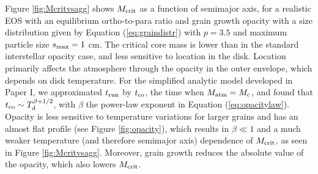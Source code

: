 Figure \ref{fig:Mcritvsagg} shows $M_{\rm crit}$ as a function of semimajor axis, for a realistic EOS with an equilibrium ortho-to-para ratio and grain growth opacity with a size distribution given by Equation (\ref{eq:graindistr}) with $p=3.5$ and maximum particle size $s_{\rm max}=1$ cm. The critical core mass is lower than in the standard interstellar opacity case, and less sensitive to location in the disk. Location primarily affects the atmosphere through the opacity in the outer envelope, which depends on disk temperature. For the simplified analytic model developed in Paper I, we approximated $t_{\rm run}$ by  $t_{\rm co}$, the time when $M_{\rm atm}=M_{\rm c}$, and found that $t_{\rm co} \sim T_{\rm d}^{\beta+1/2}$, with $\beta$ the power-law exponent in Equation (\ref{eq:opacitylaw}). Opacity is less sensitive to temperature variations for larger grains and has an almost flat profile (see Figure \ref{fig:opacity}), which results in $\beta \ll 1$ and a much weaker temperature (and therefore semimajor axis) dependence of $M_{\rm crit}$, as seen in Figure \ref{fig:Mcritvsagg}. Moreover, grain growth reduces the absolute value of the opacity, which also lowers $M_{\rm crit}$. %


